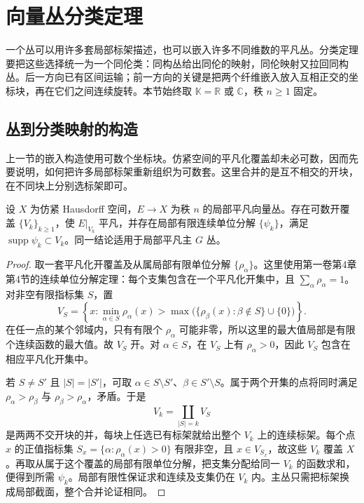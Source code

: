
% 
% 

\section{向量丛分类定理}
\label{g2:sec:1903}

一个丛可以用许多套局部标架描述，也可以嵌入许多不同维数的平凡丛。分类定理要把这些选择统一为一个同伦类：同构丛给出同伦的映射，同伦映射又拉回同构丛。后一方向已有区间运输；前一方向的关键是把两个纤维嵌入放入互相正交的坐标块，再在它们之间连续旋转。本节始终取 \(\mathbb K=\mathbb R\) 或 \(\mathbb C\)，秩 \(n\ge1\) 固定。

\subsection{丛到分类映射的构造}
\label{g2:subsec:1903:01}
上一节的嵌入构造使用可数个坐标块。仿紧空间的平凡化覆盖却未必可数，因而先要说明，如何把许多局部标架重新组织为可数套。这里合并的是互不相交的开块，在不同块上分别选标架即可。

\begin{lemma}\label{g2:lem:bundle-countable-trivialization}
	设 \(X\) 为仿紧 Hausdorff 空间，\(E\to X\) 为秩 \(n\) 的局部平凡向量丛。存在可数开覆盖 \(\{V_k\}_{k\ge1}\)，使 \(E|_{V_k}\) 平凡，并存在局部有限连续单位分解 \(\{\psi_k\}\)，满足 \(\operatorname{supp}\psi_k\subset V_k\)。同一结论适用于局部平凡主 \(G\) 丛。
\end{lemma}
\begin{proof}
	取一套平凡化开覆盖及从属局部有限单位分解 \(\{\rho_\alpha\}\)。这里使用第一卷第4章第4节的连续单位分解定理：每个支集包含在一个平凡化开集中，且 \(\sum_\alpha\rho_\alpha=1\)。对非空有限指标集 \(S\)，置
	\[
		V_S=\left\{x:\min_{\alpha\in S}\rho_\alpha(x)
		>\max\bigl(\{\rho_\beta(x):\beta\notin S\}\cup\{0\}\bigr)\right\}.
	\]
	在任一点的某个邻域内，只有有限个 \(\rho_\alpha\) 可能非零，所以这里的最大值局部是有限个连续函数的最大值。故 \(V_S\) 开。对 \(\alpha\in S\)，在 \(V_S\) 上有 \(\rho_\alpha>0\)，因此 \(V_S\) 包含在相应平凡化开集中。

	若 \(S\ne S'\) 且 \(|S|=|S'|\)，可取 \(\alpha\in S\setminus S'\)、\(\beta\in S'\setminus S\)。属于两个开集的点将同时满足 \(\rho_\alpha>\rho_\beta\) 与 \(\rho_\beta>\rho_\alpha\)，矛盾。于是
	\[
		V_k=\coprod_{|S|=k}V_S
	\]
	是两两不交开块的并，每块上任选已有标架就给出整个 \(V_k\) 上的连续标架。每个点 \(x\) 的正值指标集 \(S_x=\{\alpha:\rho_\alpha(x)>0\}\) 有限非空，且 \(x\in V_{S_x}\)，故这些 \(V_k\) 覆盖 \(X\)。再取从属于这个覆盖的局部有限单位分解，把支集分配给同一 \(V_k\) 的函数求和，便得到所需 \(\psi_k\)。局部有限性保证求和连续及支集仍在 \(V_k\) 内。主丛只需把标架换成局部截面，整个合并论证相同。
\end{proof}

